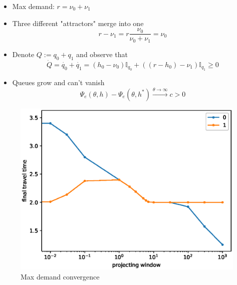 \documentclass[10pt]{beamer}
\begin{document}
\begin{frame}


\begin{itemize}

\item Max demand: $r = \nu_0 + \nu_1$

\item Three different "attractors" merge into one
$$ r - \nu_1 = r \frac{ \nu_0}{\nu_0 + \nu_1} = \nu_0 $$

\item Denote $ Q := q_0 + q_1 $ and observe that
$$ \dot{Q} = \dot{q_0} + \dot{q_1} = \left( h_0 - \nu_0 \right) \mathbb{I}_{q_0} +  \left( (r - h_0) - \nu_1 \right) \mathbb{I}_{q_1} \geq 0 $$

\item Queues grow and can't vanish 
$$ \Psi_e(\theta, h) - \Psi_e(\theta, h^*) \stackrel{\theta \to \infty}{\to} c > 0$$

\end{itemize}

\end{frame}

\begin{frame}


	\begin{center}
		\begin{figure}
			\includegraphics[scale=0.5]{img/final_tt_proj.eps}
		\caption{Max demand convergence}	
		\end{figure}	  
	\end{center}  

 

\end{frame}
\end{document}
